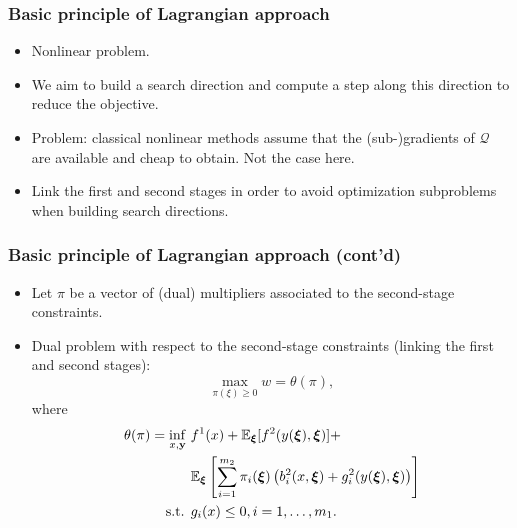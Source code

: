 \documentclass{beamer}
\begin{document}
\begin{frame}
\frametitle{Basic principle of Lagrangian approach}

\begin{itemize}
\item
Nonlinear problem.
\item
We aim to build a search direction and compute a step along this direction to reduce the objective.
\item
Problem: classical nonlinear methods assume that the (sub-)gradients of $\mathcal{Q}$ are available and cheap to obtain.
Not the case here.
\item
Link the first and second stages in order to avoid optimization subproblems when building search directions.
\end{itemize}

\end{frame}

\begin{frame}
\frametitle{Basic principle of Lagrangian approach (cont'd)}

\begin{itemize}
	\item 
Let $\pi$ be a vector of (dual) multipliers associated to the second-stage constraints.
\item
Dual problem with respect to the second-stage constraints (linking the first and second stages):
\[
\max_{\pi(\xi) \geq 0} w = \theta(\pi),
\]
where
\begin{align*}
\theta(\pi) = \inf_{x, {\bf y}}\ & f^1(x)+{\mathbb{E}}_{{\boldsymbol{\xi}}} [f^2(y({\boldsymbol{\xi}}),{\boldsymbol{\xi}})] + \\
& {\mathbb{E}}_{{\boldsymbol{\xi}}}\left[\sum_{i=1}^{m_2} \pi_i({\boldsymbol{\xi}}) \left( b_i^2(x,{\boldsymbol{\xi}}) +
  g_i^2(y({\boldsymbol{\xi}}), {\boldsymbol{\xi}}) \right) \right] \\
\text{s.t. } & g_i(x) \leq 0, i=1,\ldots{},m_1.
\end{align*}
\end{itemize}

\end{frame}
\end{document}
